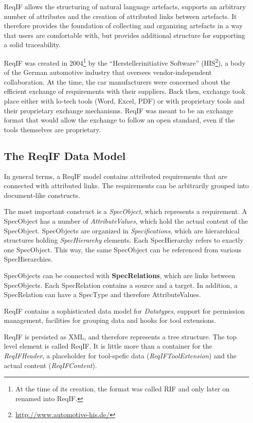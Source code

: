 \documentclass{template/openetcs_report}
\begin{document}
ReqIF allows the structuring of natural language artefacts, supports an arbitrary number of attributes and the creation of attributed links between artefacts.  It therefore provides the foundation of collecting and organizing artefacts in a way that users are comfortable with, but provides additional structure for supporting a solid traceability.

ReqIF was created in 2004\footnote{At the time of its creation, the format was called RIF and only later on renamed into ReqIF.} by the ``Herstellerinitiative Software'' (HIS\footnote{\url{http://www.automotive-his.de/}}), a body of the German automotive industry that oversees vendor-independent collaboration.  At the time, the car manufacturers were concerned about the efficient exchange of requirements with their suppliers.  Back then, exchange took place either with lo-tech tools (Word, Excel, PDF) or with proprietary tools and their proprietary exchange mechanisms.  ReqIF was meant to be an exchange format that would allow the exchange to follow an open standard, even if the tools themselves are proprietary.

\subsection{The ReqIF Data Model}

In general terms, a ReqIF model contains attributed requirements that are connected with attributed links.  The requirements can be arbitrarily grouped into document-like constructs.

The most important construct is a {\em SpecObject}, which represents a requirement. A SpecObject has a number of {\em AttributeValues}, which hold the actual content of the SpecObject. SpecObjects are organized in {\em Specifications}, which are hierarchical structures holding {\em SpecHierarchy} elements. Each SpecHierarchy refers to exactly one SpecObject. This way, the same SpecObject can be referenced from various SpecHierarchies.

SpecObjects can be connected with \textbf{SpecRelations}, which are links between SpecObjects. Each SpecRelation contains a source and a target.  In addition, a SpecRelation can have a SpecType and therefore AttributeValues.

ReqIF contains a sophisticated data model for {\em Datatypes}, support for permission management, facilities for grouping data and hooks for tool extensions.

ReqIF is persisted as XML, and therefore represents a tree structure.  The top level element is called ReqIF.  It is little more than a container for the \emph{ReqIFHeader}, a placeholder for tool-spefic data (\emph{ReqIFToolExtension}) and the actual content (\emph{ReqIFContent}).
\end{document}
